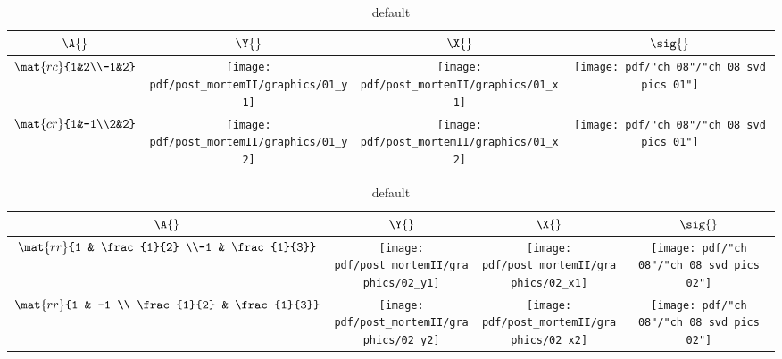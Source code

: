 \break
\clearpage
\begin{landscape}
\thispagestyle{empty}
\begin{table}[htdp]
\begin{center}
\begin{tabular}{cccc}
  $\A{}$ & $\Y{}$ & $\X{}$ & $\sig{}$ \\ \hline\hline
  $\mat{rc}{1&2\\-1&2}$ \qquad & \qquad 
  \texttt{[image: pdf/post\_mortemII/graphics/01\_y1]} \qquad & \qquad 
  \texttt{[image: pdf/post\_mortemII/graphics/01\_x1]} \qquad & \qquad 
  \texttt{[image: pdf/"ch 08"/"ch 08 svd pics 01"]} \\
  $\mat{cr}{1&-1\\2&2}$ \qquad & \qquad 
  \texttt{[image: pdf/post\_mortemII/graphics/01\_y2]} \qquad & \qquad 
  \texttt{[image: pdf/post\_mortemII/graphics/01\_x2]} \qquad & \qquad 
  \texttt{[image: pdf/"ch 08"/"ch 08 svd pics 01"]} \\
\end{tabular}
\end{center}
\caption{default}
\label{tab:pmII:visualsa}
\end{table}%
\end{landscape}
\break
\clearpage
\begin{landscape}
\thispagestyle{empty}
\begin{table}[htdp]
\begin{center}
\begin{tabular}{cccc}
  $\A{}$ & $\Y{}$ & $\X{}$ & $\sig{}$ \\ \hline\hline
  $\mat{rr}{1 & \frac{1}{2} \\-1 & \frac{1}{3}}$ \qquad & \qquad 
  \texttt{[image: pdf/post\_mortemII/graphics/02\_y1]} \qquad & \qquad 
  \texttt{[image: pdf/post\_mortemII/graphics/02\_x1]} \qquad & \qquad 
  \texttt{[image: pdf/"ch 08"/"ch 08 svd pics 02"]} \\
  $\mat{rr}{1 & -1 \\ \frac{1}{2} & \frac{1}{3}}$ \qquad & \qquad 
  \texttt{[image: pdf/post\_mortemII/graphics/02\_y2]} \qquad & \qquad 
  \texttt{[image: pdf/post\_mortemII/graphics/02\_x2]} \qquad & \qquad 
  \texttt{[image: pdf/"ch 08"/"ch 08 svd pics 02"]} \\
\end{tabular}
\end{center}
\caption{default}
\label{tab:pmII:visualsb}
\end{table}%
\end{landscape}

